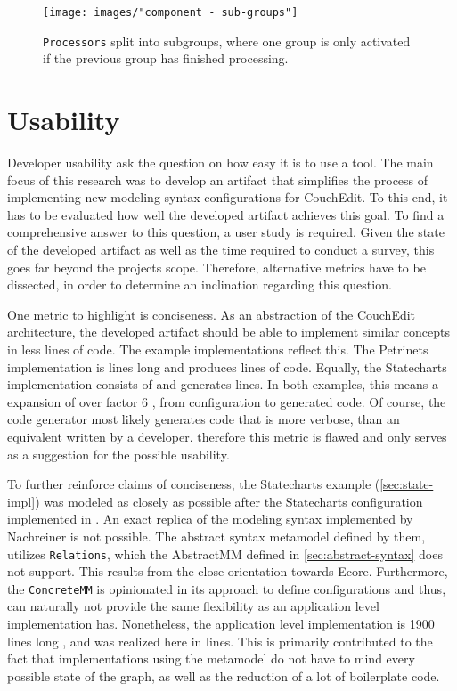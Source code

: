 \begin{figure}
\centering
\texttt{[image: images/"component - sub-groups"]}
\caption{\texttt{Processors} split into subgroups, where one group is only activated if the previous group has finished processing.}
\label{fig:sub-groups}
\end{figure}

\section{Usability}
Developer usability ask the question on how easy it is to use a tool. The main focus of this research was to develop an artifact that simplifies the process of implementing new modeling syntax configurations for CouchEdit. To this end, it has to be evaluated how well the developed artifact achieves this goal. To find a comprehensive answer to this question, a user study is required. Given the state of the developed artifact as well as the time required to conduct a survey, this goes far beyond the projects scope. Therefore, alternative metrics have to be dissected, in order to determine an inclination regarding this question. 

One metric to highlight is conciseness. As an abstraction of the CouchEdit architecture, the developed artifact should be able to implement similar concepts in less lines of code. The example implementations reflect this. The Petrinets implementation is \petriConfigLoC lines long and produces \petriGeneratedLoC lines of code. Equally, the Statecharts implementation consists of \stateConfigLoC and generates \stateGeneratedLoC lines. In both examples, this means a expansion of over factor 6 , from configuration to generated code. Of course, the code generator most likely generates code that is more verbose, than an equivalent written by a developer. therefore this metric is flawed and only serves as a suggestion for the possible usability. 

To further reinforce claims of conciseness, the Statecharts example (\ref{sec:state-impl}) was modeled as closely as possible after the Statecharts configuration implemented in \cite{nachreiner_couchedit_2020}. An exact replica of the modeling syntax implemented by Nachreiner is not possible. The abstract syntax metamodel defined by them, utilizes \texttt{Relations}, which the AbstractMM defined in \ref{sec:abstract-syntax} does not support. This results from the close orientation towards Ecore. Furthermore, the \texttt{ConcreteMM} is opinionated in its approach to define configurations and thus, can naturally not provide the same flexibility as an application level implementation has. Nonetheless, the application level implementation is 1900 lines long \cite{nachreiner_couchedit_2020}, and was realized here in \stateConfigLoC lines. This is primarily contributed to the fact that implementations using the metamodel do not have to mind every possible state of the graph, as well as the reduction of a lot of boilerplate code.

